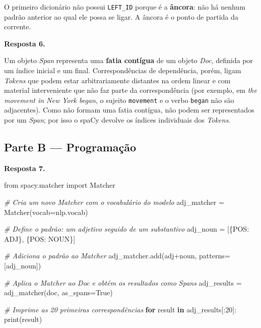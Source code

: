 \documentclass[
  brazilian,
]{article}
\newenvironment{Shaded}{}{}
\newcommand{\BuiltInTok}[1]{#1}
\newcommand{\CommentTok}[1]{\textcolor[rgb]{0.38,0.63,0.69}{\textit{#1}}}
\newcommand{\ControlFlowTok}[1]{\textcolor[rgb]{0.00,0.44,0.13}{\textbf{#1}}}
\newcommand{\DecValTok}[1]{\textcolor[rgb]{0.25,0.63,0.44}{#1}}
\newcommand{\ImportTok}[1]{#1}
\newcommand{\KeywordTok}[1]{\textcolor[rgb]{0.00,0.44,0.13}{\textbf{#1}}}
\newcommand{\NormalTok}[1]{#1}
\newcommand{\OperatorTok}[1]{\textcolor[rgb]{0.40,0.40,0.40}{#1}}
\newcommand{\StringTok}[1]{\textcolor[rgb]{0.25,0.44,0.63}{#1}}
\newcommand{\VariableTok}[1]{\textcolor[rgb]{0.10,0.09,0.49}{#1}}
\begin{document}
O primeiro dicionário não possui \texttt{LEFT\_ID} porque é a
\textbf{âncora}: não há nenhum padrão anterior ao qual ele possa se
ligar. A âncora é o ponto de partida da corrente.

\textbf{Resposta 6.}

Um objeto \emph{Span} representa uma \textbf{fatia contígua} de um
objeto \emph{Doc}, definida por um índice inicial e um final.
Correspondências de dependência, porém, ligam \emph{Tokens} que podem
estar arbitrariamente distantes na ordem linear e com material
interveniente que não faz parte da correspondência (por exemplo, em
\emph{the movement in New York began}, o sujeito \texttt{movement} e o
verbo \texttt{began} não são adjacentes). Como não formam uma fatia
contígua, não podem ser representados por um \emph{Span}; por isso o
spaCy devolve os índices individuais dos \emph{Tokens}.

\hypertarget{parte-b-programauxe7uxe3o}{%
\subsection{Parte B --- Programação}\label{parte-b-programauxe7uxe3o}}

\textbf{Resposta 7.}

\begin{Shaded}
\begin{Highlighting}[]
\ImportTok{from}\NormalTok{ spacy.matcher }\ImportTok{import}\NormalTok{ Matcher}

\CommentTok{\# Cria um novo Matcher com o vocabulário do modelo}
\NormalTok{adj\_matcher }\OperatorTok{=}\NormalTok{ Matcher(vocab}\OperatorTok{=}\NormalTok{nlp.vocab)}

\CommentTok{\# Define o padrão: um adjetivo seguido de um substantivo}
\NormalTok{adj\_noun }\OperatorTok{=}\NormalTok{ [\{}\StringTok{\textquotesingle{}POS\textquotesingle{}}\NormalTok{: }\StringTok{\textquotesingle{}ADJ\textquotesingle{}}\NormalTok{\}, \{}\StringTok{\textquotesingle{}POS\textquotesingle{}}\NormalTok{: }\StringTok{\textquotesingle{}NOUN\textquotesingle{}}\NormalTok{\}]}

\CommentTok{\# Adiciona o padrão ao Matcher}
\NormalTok{adj\_matcher.add(}\StringTok{\textquotesingle{}adj+noun\textquotesingle{}}\NormalTok{, patterns}\OperatorTok{=}\NormalTok{[adj\_noun])}

\CommentTok{\# Aplica o Matcher ao Doc e obtém os resultados como Spans}
\NormalTok{adj\_results }\OperatorTok{=}\NormalTok{ adj\_matcher(doc, as\_spans}\OperatorTok{=}\VariableTok{True}\NormalTok{)}

\CommentTok{\# Imprime as 20 primeiras correspondências}
\ControlFlowTok{for}\NormalTok{ result }\KeywordTok{in}\NormalTok{ adj\_results[:}\DecValTok{20}\NormalTok{]:}
    \BuiltInTok{print}\NormalTok{(result)}
\end{Highlighting}
\end{Shaded}
\end{document}
